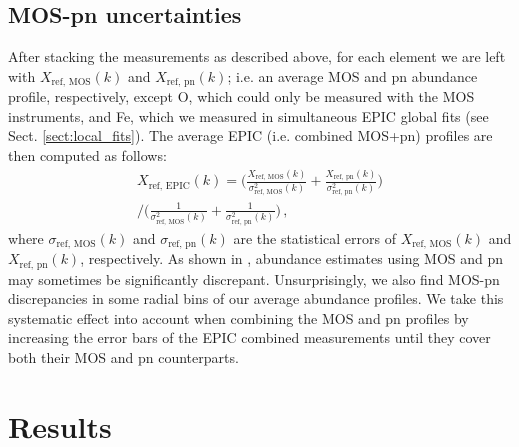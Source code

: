 \documentclass{aa}
\begin{document}
\subsection{MOS-pn uncertainties}\label{sect:MOS-pn_uncertainties}

After stacking the measurements as described above, for each element we are left with $X_\text{ref, MOS}(k)$ and $X_\text{ref, pn}(k)$; i.e. an average MOS and pn abundance profile, respectively, except O, which could only be measured with the MOS instruments, and Fe, which we measured in simultaneous EPIC global fits (see Sect. \ref{sect:local_fits}). The average EPIC (i.e. combined MOS+pn) profiles are then computed as follows:
\begin{align}
X_\text{ref, EPIC}(k) = \bigg( \frac{X_\text{ref, MOS}(k)}{\sigma^2_\text{ref, MOS}(k)} + \frac{X_\text{ref, pn}(k)}{\sigma^2_\text{ref, pn}(k)} \bigg)  \nonumber \\
\bigg/ \bigg( \frac{1}{\sigma^2_\text{ref, MOS}(k)} + \frac{1}{\sigma^2_\text{ref, pn}(k)} \bigg) \, ,
\end{align} 
where $\sigma_\text{ref, MOS}(k)$ and $\sigma_\text{ref, pn}(k)$ are the statistical errors of $X_\text{ref, MOS}(k)$ and $X_\text{ref, pn}(k)$, respectively.
As shown in \citet{2016A&A...592A.157M}, abundance estimates using MOS and pn may sometimes be significantly discrepant. Unsurprisingly, we also find MOS-pn discrepancies in some radial bins of our average abundance profiles. We take this systematic effect into account when combining the MOS and pn profiles by increasing the error bars of the EPIC combined measurements until they cover both their MOS and pn counterparts.























\section{Results}\label{sect:results}

\end{document}
